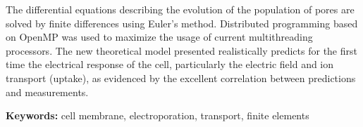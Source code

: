 The differential equations describing the evolution of the population of pores are solved by finite differences using Euler's method.
Distributed programming based on OpenMP was used to maximize the usage of current multithreading processors.
The new theoretical model presented realistically predicts for the first time the electrical response of the cell, particularly the electric field and ion transport (uptake), as evidenced by the excellent correlation between predictions and measurements. 

\bigskip

\noindent\textbf{Keywords:} cell membrane, electroporation, transport, finite elements
